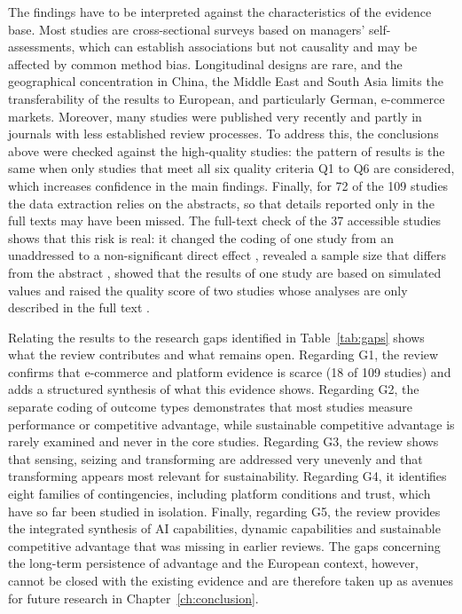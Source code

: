 The findings have to be interpreted against the characteristics of the evidence base. Most studies are cross-sectional surveys based on managers' self-assessments, which can establish associations but not causality and may be affected by common method bias. Longitudinal designs are rare, and the geographical concentration in China, the Middle East and South Asia limits the transferability of the results to European, and particularly German, e-commerce markets. Moreover, many studies were published very recently and partly in journals with less established review processes. To address this, the conclusions above were checked against the high-quality studies: the pattern of results is the same when only studies that meet all six quality criteria Q1 to Q6 are considered, which increases confidence in the main findings. Finally, for 72 of the 109 studies the data extraction relies on the abstracts, so that details reported only in the full texts may have been missed. The full-text check of the 37 accessible studies shows that this risk is real: it changed the coding of one study from an unaddressed to a non-significant direct effect \parencite[1]{slrR059}, revealed a sample size that differs from the abstract \parencite[1]{slrR041}, showed that the results of one study are based on simulated values \parencite[1]{slrR086} and raised the quality score of two studies whose analyses are only described in the full text \parencites[1]{slrR102}[322]{slrR129}.

Relating the results to the research gaps identified in Table~\ref{tab:gaps} shows what the review contributes and what remains open. Regarding G1, the review confirms that e-commerce and platform evidence is scarce (18 of 109 studies) and adds a structured synthesis of what this evidence shows. Regarding G2, the separate coding of outcome types demonstrates that most studies measure performance or competitive advantage, while sustainable competitive advantage is rarely examined and never in the core studies. Regarding G3, the review shows that sensing, seizing and transforming are addressed very unevenly and that transforming appears most relevant for sustainability. Regarding G4, it identifies eight families of contingencies, including platform conditions and trust, which have so far been studied in isolation. Finally, regarding G5, the review provides the integrated synthesis of AI capabilities, dynamic capabilities and sustainable competitive advantage that was missing in earlier reviews. The gaps concerning the long-term persistence of advantage and the European context, however, cannot be closed with the existing evidence and are therefore taken up as avenues for future research in Chapter~\ref{ch:conclusion}.

